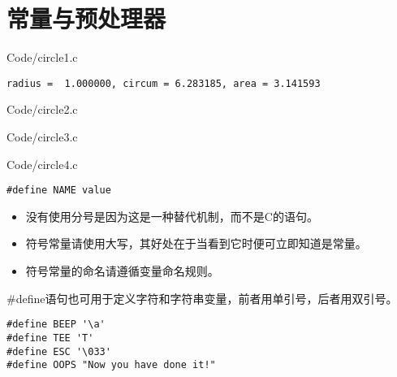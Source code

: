 \section{常量与预处理器}

\begin{frame}[fragile]\ft{\secname}

{Code/circle1.c}
\end{frame}

\begin{frame}[fragile]\ft{\secname}
\begin{lstlisting}[backgroundcolor=\color{red!10}]
radius =  1.000000, circum = 6.283185, area = 3.141593
\end{lstlisting}
\end{frame}

\begin{frame}[fragile]\ft{\secname}

{Code/circle2.c}
\end{frame}

\begin{frame}[fragile]\ft{\secname}

{Code/circle3.c}
\end{frame}

\begin{frame}[fragile]\ft{\secname}

{Code/circle4.c}

\end{frame}

\begin{frame}[fragile]
\begin{lstlisting}[title=宏定义的一般形式,backgroundcolor=\color{red!10}]
#define NAME value
\end{lstlisting}

\begin{itemize}
\item 没有使用分号是因为这是一种替代机制，而不是C的语句。\\[0.1in]
\item 符号常量请使用大写，其好处在于当看到它时便可立即知道是常量。\\[0.1in]
\item 符号常量的命名请遵循变量命名规则。
\end{itemize}
\end{frame}

\begin{frame}[fragile]
\#define语句也可用于定义字符和字符串变量，前者用单引号，后者用双引号。
\vspace{0.1in}

\begin{lstlisting}
#define BEEP '\a'
#define TEE 'T'
#define ESC '\033'
#define OOPS "Now you have done it!"
\end{lstlisting}

\end{frame}

